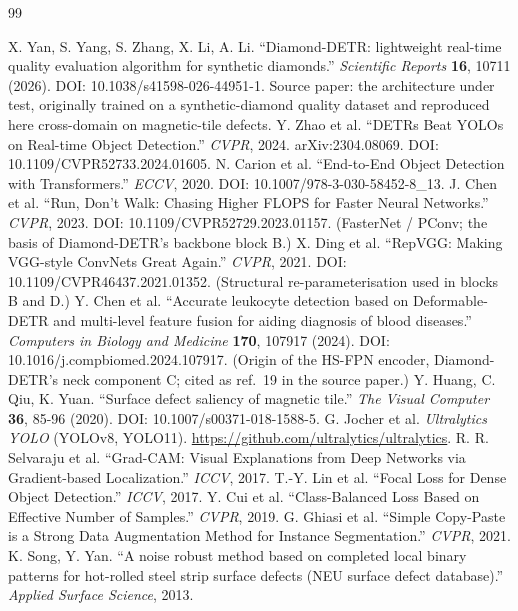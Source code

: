 \documentclass[11pt,a4paper]{article}
\begin{document}
\begin{thebibliography}{99}
\small
{} X. Yan, S. Yang, S. Zhang, X. Li, A. Li. ``Diamond-DETR: lightweight real-time
quality evaluation algorithm for synthetic diamonds.'' \emph{Scientific Reports} \textbf{16}, 10711
(2026). DOI: 10.1038/s41598-026-44951-1. Source paper: the architecture under test, originally trained
on a synthetic-diamond quality dataset and reproduced here cross-domain on magnetic-tile defects.
 Y. Zhao et al. ``DETRs Beat YOLOs on Real-time Object Detection.''
\emph{CVPR}, 2024. arXiv:2304.08069. DOI: 10.1109/CVPR52733.2024.01605.
 N. Carion et al. ``End-to-End Object Detection with Transformers.''
\emph{ECCV}, 2020. DOI: 10.1007/978-3-030-58452-8\_13.
 J. Chen et al. ``Run, Don't Walk: Chasing Higher FLOPS for Faster Neural
Networks.'' \emph{CVPR}, 2023. DOI: 10.1109/CVPR52729.2023.01157. (FasterNet / PConv; the basis of
Diamond-DETR's backbone block B.)
 X. Ding et al. ``RepVGG: Making VGG-style ConvNets Great Again.'' \emph{CVPR}, 2021.
DOI: 10.1109/CVPR46437.2021.01352. (Structural re-parameterisation used in blocks B and D.)
 Y. Chen et al. ``Accurate leukocyte detection based on Deformable-DETR and multi-level
feature fusion for aiding diagnosis of blood diseases.'' \emph{Computers in Biology and Medicine}
\textbf{170}, 107917 (2024). DOI: 10.1016/j.compbiomed.2024.107917. (Origin of the HS-FPN encoder,
Diamond-DETR's neck component C; cited as ref.~19 in the source paper.)
 Y. Huang, C. Qiu, K. Yuan. ``Surface defect saliency of magnetic tile.''
\emph{The Visual Computer} \textbf{36}, 85-96 (2020). DOI: 10.1007/s00371-018-1588-5.
 G. Jocher et al. \emph{Ultralytics YOLO} (YOLOv8, YOLO11).
\url{https://github.com/ultralytics/ultralytics}.
 R. R. Selvaraju et al. ``Grad-CAM: Visual Explanations from Deep Networks via
Gradient-based Localization.'' \emph{ICCV}, 2017.
 T.-Y. Lin et al. ``Focal Loss for Dense Object Detection.'' \emph{ICCV}, 2017.
 Y. Cui et al. ``Class-Balanced Loss Based on Effective Number of Samples.''
\emph{CVPR}, 2019.
 G. Ghiasi et al. ``Simple Copy-Paste is a Strong Data Augmentation Method for
Instance Segmentation.'' \emph{CVPR}, 2021.
 K. Song, Y. Yan. ``A noise robust method based on completed local binary patterns for
hot-rolled steel strip surface defects (NEU surface defect database).''
\emph{Applied Surface Science}, 2013.
\end{thebibliography}
\end{document}
